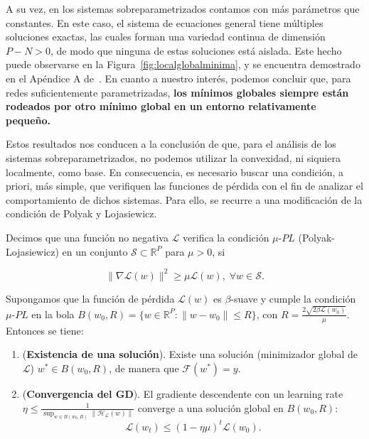 A su vez, en los sistemas sobreparametrizados contamos con más parámetros que constantes. En este caso, el sistema de ecuaciones general tiene múltiples soluciones exactas, las cuales forman una variedad continua de dimensión $P - N > 0$, de modo que ninguna de estas soluciones está aislada. Este hecho puede observarse en la Figura~\ref{fig:localglobalminima}, y se encuentra demostrado en el Apéndice A de~\cite{Liu2021}. En cuanto a nuestro interés, podemos concluir que, para redes suficientemente parametrizadas, \textbf{los mínimos globales siempre están rodeados por otro mínimo global en un entorno relativamente pequeño.}

Estos resultados nos conducen a la conclusión de que, para el análisis de los sistemas sobreparametrizados, no podemos utilizar la convexidad, ni siquiera localmente, como base. En consecuencia, es necesario buscar una condición, a priori, más simple, que verifiquen las funciones de pérdida con el fin de analizar el comportamiento de dichos sistemas. Para ello, se recurre a una modificación de la condición de Polyak y Lojasiewicz.

\begin{definicion}[Condición $\mu$-$PL$]
    Decimos que una función no negativa $\mathcal{L}$ verifica la condición $\mu$-$PL$ (Polyak-Lojasiewicz) en un conjunto $\mathcal{S} \subset \mathbb{R}^{P}$ para $\mu > 0$, si

    \[
        \| \nabla \mathcal{L}(w) \|^{2} \geq \mu \mathcal{L}(w), \; \forall w \in \mathcal{S}.
    \]
\end{definicion}

\begin{teorema}
    Supongamos que la función de pérdida $\mathcal{L}(w)$ es $\beta$-suave y cumple la condición $\mu$-$PL$ en la bola $B(w_0, R) = \{ w \in \mathbb{R}^{P} : \| w - w_0 \| \leq R \}$, con $R = \frac{2 \sqrt{2 \beta \mathcal{L}(w_0)}}{\mu}$. Entonces se tiene:

    \begin{enumerate}
        \item (\textbf{Existencia de una solución}). Existe una solución (minimizador global de $\mathcal{L}$) $w^{*} \in B(w_0, R)$, de manera que $\mathcal{F}(w^{*}) = y$.
        \item (\textbf{Convergencia del GD}). El gradiente descendente con un learning rate $\eta \leq \frac{1}{\sup_{w \in B(w_0, R)} \| \mathcal{H}_{\mathcal{L}}(w) \|}$ converge a una solución global en $B(w_0, R)$:
        \[
            \mathcal{L}(w_{t}) \leq (1 - \eta \mu)^{t} \mathcal{L}(w_0).
        \]
    \end{enumerate}
\end{teorema}

